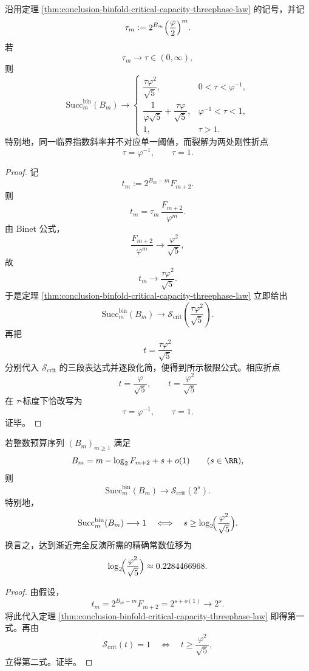 \begin{theorem}[临界预算的双折点相律]\label{thm:conclusion-binfold-critical-budget-double-kink-law}
沿用定理 \ref{thm:conclusion-binfold-critical-capacity-threephase-law} 的记号，并记
\[
\tau_m:=2^{B_m}\Bigl(\frac{\varphi}{2}\Bigr)^m.
\]
若
\[
\tau_m\longrightarrow \tau\in(0,\infty),
\]
则
\[
\mathrm{Succ}_m^{\mathrm{bin}}(B_m)\longrightarrow
\begin{cases}
\dfrac{\tau\varphi^2}{\sqrt5}, & 0<\tau<\varphi^{-1},\\[6pt]
\dfrac{1}{\varphi\sqrt5}+\dfrac{\tau\varphi}{\sqrt5},
& \varphi^{-1}<\tau<1,\\[8pt]
1, & \tau>1.
\end{cases}
\]
特别地，同一临界指数斜率并不对应单一阈值，而裂解为两处刚性折点
\[
\tau=\varphi^{-1},
\qquad
\tau=1.
\]
\end{theorem}
\begin{proof}
记
\[
t_m:=2^{B_m-m}F_{m+2}.
\]
则
\[
t_m
=
\tau_m\,\frac{F_{m+2}}{\varphi^m}.
\]
由 Binet 公式，
\[
\frac{F_{m+2}}{\varphi^m}\longrightarrow \frac{\varphi^2}{\sqrt5},
\]
故
\[
t_m\longrightarrow \frac{\tau\varphi^2}{\sqrt5}.
\]
于是定理 \ref{thm:conclusion-binfold-critical-capacity-threephase-law} 立即给出
\[
\mathrm{Succ}_m^{\mathrm{bin}}(B_m)\longrightarrow
\mathcal S_{\mathrm{crit}}\!\left(\frac{\tau\varphi^2}{\sqrt5}\right).
\]
再把
\[
t=\frac{\tau\varphi^2}{\sqrt5}
\]
分别代入 \(\mathcal S_{\mathrm{crit}}\) 的三段表达式并逐段化简，便得到所示极限公式。相应折点
\[
t=\frac{\varphi}{\sqrt5},
\qquad
t=\frac{\varphi^2}{\sqrt5}
\]
在 \(\tau\)-标度下恰改写为
\[
\tau=\varphi^{-1},
\qquad
\tau=1.
\]
证毕。
\end{proof}

\begin{corollary}[完全反演阈值的精确常数位移]\label{cor:conclusion-binfold-full-inversion-golden-threshold}
若整数预算序列 \((B_m)_{m\ge 1}\) 满足
\[
B_m=m-\log_2F_{m+2}+s+o(1)
\qquad (s\in\RR),
\]
则
\[
\mathrm{Succ}_m^{\mathrm{bin}}(B_m)\longrightarrow \mathcal S_{\mathrm{crit}}(2^s).
\]
特别地，
\[
\mathrm{Succ}_m^{\mathrm{bin}}(B_m)\longrightarrow 1
\quad\Longleftrightarrow\quad
s\ge \log_2\!\Bigl(\frac{\varphi^2}{\sqrt5}\Bigr).
\]
换言之，达到渐近完全反演所需的精确常数位移为
\[
\log_2\!\Bigl(\frac{\varphi^2}{\sqrt5}\Bigr)\approx 0.2284466968.
\]
\end{corollary}
\begin{proof}
由假设，
\[
t_m
=
2^{B_m-m}F_{m+2}
=
2^{s+o(1)}
\longrightarrow
2^s.
\]
将此代入定理 \ref{thm:conclusion-binfold-critical-capacity-threephase-law} 即得第一式。再由
\[
\mathcal S_{\mathrm{crit}}(t)=1
\quad\Longleftrightarrow\quad
t\ge \frac{\varphi^2}{\sqrt5},
\]
立得第二式。证毕。
\end{proof}

